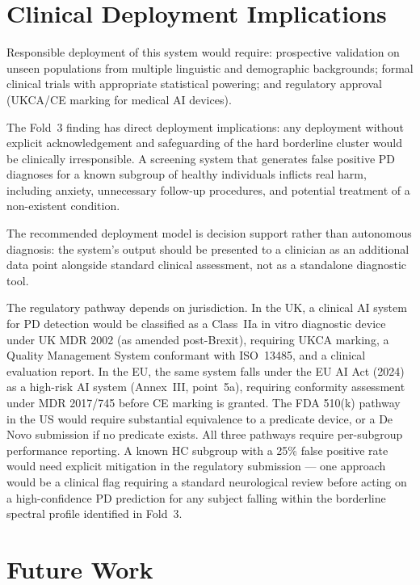 \documentclass[oneside,openany]{final_report}
\begin{document}
\section{Clinical Deployment Implications}

Responsible deployment of this system would require: prospective validation on unseen populations from multiple linguistic and demographic backgrounds; formal clinical trials with appropriate statistical powering; and regulatory approval (UKCA/CE marking for medical AI devices).

The Fold~3 finding has direct deployment implications: any deployment without explicit acknowledgement and safeguarding of the hard borderline cluster would be clinically irresponsible. A screening system that generates false positive PD diagnoses for a known subgroup of healthy individuals inflicts real harm, including anxiety, unnecessary follow-up procedures, and potential treatment of a non-existent condition.

The recommended deployment model is decision support rather than autonomous diagnosis: the system's output should be presented to a clinician as an additional data point alongside standard clinical assessment, not as a standalone diagnostic tool.

The regulatory pathway depends on jurisdiction. In the UK, a clinical AI system for PD detection would be classified as a Class~IIa in vitro diagnostic device under UK MDR 2002 (as amended post-Brexit), requiring UKCA marking, a Quality Management System conformant with ISO~13485, and a clinical evaluation report. In the EU, the same system falls under the EU AI Act (2024) as a high-risk AI system (Annex~III, point~5a), requiring conformity assessment under MDR 2017/745 before CE marking is granted. The FDA 510(k) pathway in the US would require substantial equivalence to a predicate device, or a De Novo submission if no predicate exists. All three pathways require per-subgroup performance reporting. A known HC subgroup with a 25\% false positive rate would need explicit mitigation in the regulatory submission --- one approach would be a clinical flag requiring a standard neurological review before acting on a high-confidence PD prediction for any subject falling within the borderline spectral profile identified in Fold~3.

\section{Future Work}
\label{sec:future_work}
\end{document}
